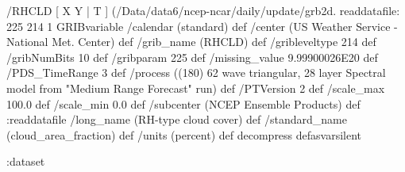 \begin{ingrid}
  /RHCLD { [ X Y | T ] (/Data/data6/ncep-ncar/daily/update/grb2d.%
  readdatafile:
  225 214 1 GRIBvariable
  /calendar (standard) def
  /center (US Weather Service - National Met. Center) def
  /grib_name (RHCLD) def
  /gribleveltype 214 def
  /gribNumBits 10 def
  /gribparam 225 def
  /missing_value 9.99900026E20 def
  /PDS_TimeRange 3 def
  /process ((180) 62 wave triangular, 28 layer Spectral model from "Medium Range Forecast" run) def
  /PTVersion 2 def
  /scale_max 100.0 def
  /scale_min 0.0 def
  /subcenter (NCEP Ensemble Products) def
  :readdatafile
  /long_name (RH-type cloud cover) def
  /standard_name (cloud_area_fraction) def
  /units (percent) def
  decompress
  } defasvarsilent

 :dataset

\end{ingrid}

